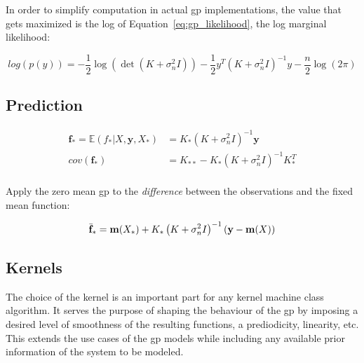 In order to simplify computation in actual \acrshort{gp} implementations, the
value that gets maximized is the log of Equation~\ref{eq:gp_likelihood}, the log
marginal likelihood:

\begin{equation}\label{eq:gp_log_likelihood}
    log(p(y)) = - \frac{1}{2}\log{\left(
                                \det{\left(
                                        K + \sigma_n^2I
                                \right)}
                            \right)}
                - \frac{1}{2}y^T\left(
                                    K + \sigma_n^2I
                                \right)^{-1}y
                - \frac{n}{2}\log{\left(2\pi\right)}
\end{equation}

\subsection{Prediction}

\begin{equation}
    \begin{aligned}
        \mathbf{f_*} = \mathbb{E}\left(f_*|X, \mathbf{y}, X_*\right) &=
        K_*\left(K + \sigma_n^2I\right)^{-1}\mathbf{y} \\
        cov(\mathbf{f_*}) &= K_{**} - K_*\left(K +\sigma_n^2I\right)^{-1}K_*^T \\
    \end{aligned}
\end{equation}


Apply the zero mean \acrshort{gp} to the \textit{difference} between the
observations and the fixed mean function:

\begin{equation}
    \bar{\mathbf{f}}_* = \mathbf{m}(X_*) + K_*\left(K + 
    \sigma_n^2I\right)^{-1}(\mathbf{y} - \mathbf{m}(X)) \\
\end{equation}

\subsection{Kernels}
The choice of the kernel is an important part for any kernel machine class
algorithm. It serves the purpose of shaping the behaviour of the \acrshort{gp}
by imposing a desired level of smoothness of the resulting functions, a
prediodicity, linearity, etc. This extends the use cases of the \acrshort{gp}
models while including any available prior information of the system to be
modeled.

